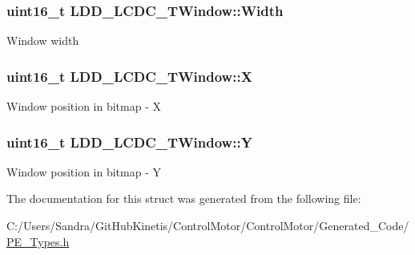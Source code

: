 \subsubsection[{\texorpdfstring{Width}{Width}}]{\setlength{\rightskip}{0pt plus 5cm}uint16\+\_\+t L\+D\+D\+\_\+\+L\+C\+D\+C\+\_\+\+T\+Window\+::\+Width}\hypertarget{struct_l_d_d___l_c_d_c___t_window_a53ee53813f5884a400be8ca3093233c4}{}\label{struct_l_d_d___l_c_d_c___t_window_a53ee53813f5884a400be8ca3093233c4}
Window width 
\subsubsection[{\texorpdfstring{X}{X}}]{\setlength{\rightskip}{0pt plus 5cm}uint16\+\_\+t L\+D\+D\+\_\+\+L\+C\+D\+C\+\_\+\+T\+Window\+::X}\hypertarget{struct_l_d_d___l_c_d_c___t_window_a9dd1270e9794b4dbd79b2b30afca87c9}{}\label{struct_l_d_d___l_c_d_c___t_window_a9dd1270e9794b4dbd79b2b30afca87c9}
Window position in bitmap -\/ X 
\subsubsection[{\texorpdfstring{Y}{Y}}]{\setlength{\rightskip}{0pt plus 5cm}uint16\+\_\+t L\+D\+D\+\_\+\+L\+C\+D\+C\+\_\+\+T\+Window\+::Y}\hypertarget{struct_l_d_d___l_c_d_c___t_window_af64f532d1fb5899c563ba40df90867d8}{}\label{struct_l_d_d___l_c_d_c___t_window_af64f532d1fb5899c563ba40df90867d8}
Window position in bitmap -\/ Y 

The documentation for this struct was generated from the following file\+:\begin{DoxyCompactItemize}
\item 
C\+:/\+Users/\+Sandra/\+Git\+Hub\+Kinetis/\+Control\+Motor/\+Control\+Motor/\+Generated\+\_\+\+Code/\hyperlink{_p_e___types_8h}{P\+E\+\_\+\+Types.\+h}\end{DoxyCompactItemize}
